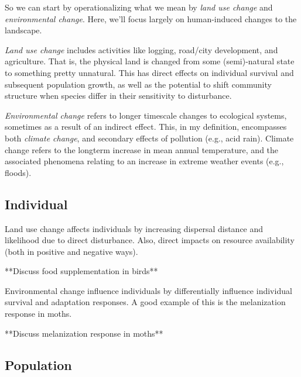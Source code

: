 \documentclass[12pt]{article}
\begin{document}
So we can start by operationalizing what we mean by \textit{land use change} and \textit{environmental change}. Here, we'll focus largely on human-induced changes to the landscape. 




\textit{Land use change} includes activities like logging, road/city development, and agriculture. That is, the physical land is changed from some (semi)-natural state to something pretty unnatural. This has direct effects on individual survival and subsequent population growth, as well as the potential to shift community structure when species differ in their sensitivity to disturbance.



\textit{Environmental change} refers to longer timescale changes to ecological systems, sometimes as a result of an indirect effect. This, in my definition, encompasses both \textit{climate change}, and secondary effects of pollution (e.g., acid rain). Climate change refers to the longterm increase in mean annual temperature, and the associated phenomena relating to an increase in extreme weather events (e.g., floods). 












\bigskip
\subsection*{Individual}

Land use change affects individuals by increasing dispersal distance and likelihood due to direct disturbance. Also, direct impacts on resource availability (both in positive and negative ways). 

**Discuss food supplementation in birds**



Environmental change influence individuals by differentially influence individual survival and adaptation responses. A good example of this is the melanization response in moths. 

**Discuss melanization response in moths**














\bigskip
\subsection*{Population}
\end{document}
